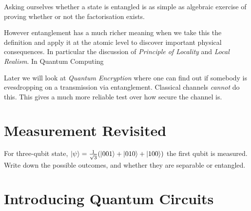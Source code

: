 
Asking ourselves whether a state is entangled is as simple as algebraic 
exercise of proving whether or not the factorisation exists. 


However entanglement has a much richer meaning when we take this 
the definition and apply it at the atomic level to discover important physical consequences. 
In particular the discussion of \textit{Principle of Locality} and \textit{Local Realism}.
In Quantum Computing 

Later we will look at \textit{Quantum Encryption} where one can find out if somebody is 
evesdropping on a transmission via entanglement. Classical channels \textit{cannot} do this.
This gives a much more reliable test over how secure the channel is. 

\section{Measurement Revisited}


\begin{example}
For three-qubit state, $\left|\psi\right\rangle = \frac{1}{\sqrt{3}}(\left|001\right\rangle + \left|010\right\rangle + \left|100\right\rangle)$
the first qubit is measured. Write down the possible outcomes,
and whether they are separable or entangled.


\end{example}









\section{Introducing Quantum Circuits}



